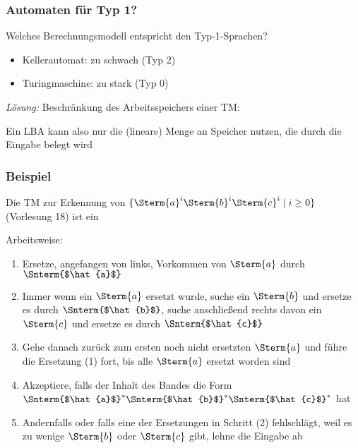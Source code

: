 \documentclass[aspectratio=1610,onlymath]{beamer}
\begin{document}

\begin{frame}\frametitle{Automaten für Typ 1?}

Welches Berechnungsmodell entspricht den Typ-1-Sprachen?
\begin{itemize}
\item Kellerautomat: zu schwach (Typ 2)
\item Turingmaschine: zu stark (Typ 0)
\end{itemize}\pause

\emph{Lösung:} Beschränkung des Arbeitsspeichers einer TM:\medskip

\medskip

Ein LBA kann also nur die (lineare) Menge an Speicher nutzen, die durch die Eingabe belegt wird

\end{frame}

\begin{frame}\frametitle{Beispiel}

Die TM zur Erkennung von $\{\Sterm{a}^i\Sterm{b}^i\Sterm{c}^i\mid i\geq 0\}$ (Vorlesung 18) ist ein 
\bigskip

\footnotesize
Arbeitsweise:
\begin{enumerate}[(1)]
\item Ersetze, angefangen von links, Vorkommen von $\Sterm{a}$ durch $\Snterm{$\hat{a}$}$
\item Immer wenn ein $\Sterm{a}$ ersetzt wurde, suche ein $\Sterm{b}$ und ersetze es durch $\Snterm{$\hat{b}$}$,
suche anschließend rechts davon ein $\Sterm{c}$ und ersetze es durch $\Snterm{$\hat{c}$}$
\item Gehe danach zurück zum ersten noch nicht ersetzten $\Sterm{a}$ und führe die Ersetzung (1) fort, bis alle $\Sterm{a}$ ersetzt worden sind
\item Akzeptiere, falls der Inhalt des Bandes die Form $\Snterm{$\hat{a}$}^*\Snterm{$\hat{b}$}^*\Snterm{$\hat{c}$}^*$ hat
\item Andernfalls oder falls eine der Ersetzungen in Schritt (2) fehlschlägt, weil es zu wenige $\Sterm{b}$ oder $\Sterm{c}$ gibt, lehne die Eingabe ab
\end{enumerate}



\end{frame}
\end{document}
